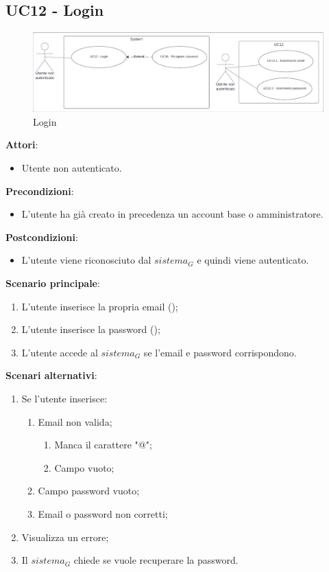 \subsection{UC12 - Login} \label{usecase:12}
\begin{figure}[H]
    \centering
    \includegraphics[width=0.9\linewidth]{ucd/ucd12.png}
    \caption{Login}
\end{figure}
\textbf{Attori}:
\begin{itemize}
    \item Utente non autenticato.
\end{itemize}
\textbf{Precondizioni}:
\begin{itemize}
    \item L'utente ha già creato in precedenza un account base o amministratore.
\end{itemize}
\textbf{Postcondizioni}:
\begin{itemize}
    \item L'utente viene riconosciuto dal $\textit{sistema}_G$ e quindi viene autenticato.
\end{itemize}
\textbf{Scenario principale}:
\begin{enumerate}
    \item L'utente inserisce la propria email ();
    \item L'utente inserisce la password ();
    \item L'utente accede al $\textit{sistema}_G$ se l'email e password corrispondono.
\end{enumerate}
\textbf{Scenari alternativi}:
\begin{enumerate}
    \item Se l'utente inserisce:
    \begin{enumerate}
        \item Email non valida;
        \begin{enumerate}
            \item Manca il carattere "@";
            \item Campo vuoto;
        \end{enumerate}
        \item Campo password vuoto;
        \item Email o password non corretti;
    \end{enumerate}
    \item Visualizza un errore;
    \item Il $\textit{sistema}_G$ chiede se vuole recuperare la password.
\end{enumerate}